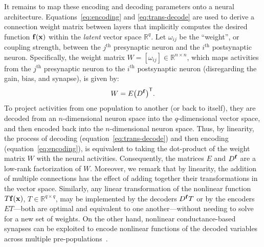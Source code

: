 It remains to map these encoding and decoding parameters onto a neural architecture.
Equations~\ref{eq:encoding} and \ref{eq:trans-decode} are used to derive a connection weight matrix between layers that implicitly computes the desired function $\mathbf{f}(\mathbf{x})$ within the \emph{latent} vector space $\mathbb{R}^q$.
Let $\omega_{ij}$ be the ``weight'', or coupling strength, between the $j^\text{th}$ presynaptic neuron and the $i^\text{th}$ postsynaptic neuron.
Specifically, the weight matrix $W = [\omega_{ij}] \in \mathbb{R}^{n \times n}$, which maps activities from the $j^{\text{th}}$ presynaptic neuron to the $i^{\text{th}}$ postsynaptic neuron (disregarding the gain, bias, and synapse), is given by:
\begin{equation} \label{eq:factored-weights}
W = E {\left(D^{\mathbf{f}}\right)}^\mathsf{T} \text{.}
\end{equation}
To project activities from one population to another (or back to itself), they are decoded from an $n$-dimensional neuron space into the $q$-dimensional vector space, and then encoded back into the $n$-dimensional neuron space.
Thus, by linearity, the process of decoding (equation~\ref{eq:trans-decode}) and then encoding (equation~\ref{eq:encoding}), is equivalent to taking the dot-product of the weight matrix $W$ with the neural activities.
Consequently, the matrices $E$ and $D^{\mathbf{f}}$ are a low-rank factorization of $W$.
Moreover, we remark that by linearity, the addition of multiple connections has the effect of adding together their transformations in the vector space. Similarly, any linear transformation of the nonlinear function $T\mathbf{f}(\mathbf{x})$, $T \in \mathbb{R}^{q \times q}$, may be implemented by the decoders $D^{\mathbf{f}}T$ or by the encoders $ET$---both are optimal and equivalent to one another---without needing to solve for a new set of weights.
On the other hand, nonlinear conductance-based synapses can be exploited to encode nonlinear functions of the decoded variables across multiple pre-populations~\citep{stoeckel2018}.

